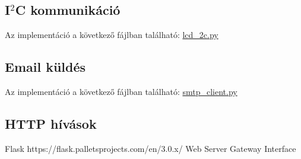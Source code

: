 \documentclass[11pt, a4paper]{article}
\begin{document}
		\subsection{I$^2$C kommunikáció}
			\begin{flushleft}
				\justifying
				Az implementáció a következő fájlban található:
				\color{blue} \href{https://github.com/mark182182/GKLB_INTM020_mikroelektromechanikai_rendszerek/blob/main/raspi/lcd_i2c.py}{lcd\_2c.py}
				
				
			\end{flushleft}
		
		\subsection{Email küldés}
		\begin{flushleft}
			\justifying
			Az implementáció a következő fájlban található:
			\color{blue} \href{https://github.com/mark182182/GKLB_INTM020_mikroelektromechanikai_rendszerek/blob/main/smtp/smtp_client.py}{smtp\_client.py}
		\end{flushleft}	
			
			
		\subsection{HTTP hívások}
			\label{subs:httpcalls}
			\begin{flushleft}
				\justifying
				Flask https://flask.palletsprojects.com/en/3.0.x/
				Web Server Gateway Interface
			\end{flushleft}
			
\end{document}
